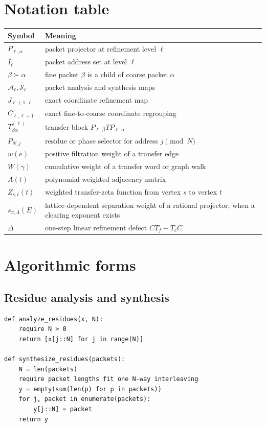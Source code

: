 \documentclass[11pt]{article}
\theoremstyle{definition}
\theoremstyle{remark}
\newcommand{\cA}{\mathcal A}
\newcommand{\cS}{\mathcal S}
\begin{document}
\appendix

\section{Notation table}

\begin{longtable}{L{0.28\textwidth}L{0.64\textwidth}}
\toprule
Symbol & Meaning \\
\midrule
\endhead
$P_{\ell,\alpha}$ & packet projector at refinement level $\ell$ \\
$I_\ell$ & packet address set at level $\ell$ \\
$\beta\succ\alpha$ & fine packet $\beta$ is a child of coarse packet $\alpha$ \\
$\cA_\ell,\cS_\ell$ & packet analysis and synthesis maps \\
$J_{\ell+1,\ell}$ & exact coordinate refinement map \\
$C_{\ell,\ell+1}$ & exact fine-to-coarse coordinate regrouping \\
$T^{(\ell)}_{\beta\alpha}$ & transfer block $P_{\ell,\beta}TP_{\ell,\alpha}$ \\
$P_{N,j}$ & residue or phase selector for address $j\pmod N$ \\
$w(e)$ & positive filtration weight of a transfer edge \\
$W(\gamma)$ & cumulative weight of a transfer word or graph walk \\
$A(t)$ & polynomial weighted adjacency matrix \\
$Z_{s,t}(t)$ & weighted transfer-zeta function from vertex $s$ to vertex $t$ \\
$s_{\pi,\Lambda}(E)$ & lattice-dependent separation weight of a rational projector, when a clearing exponent exists \\
$\Delta$ & one-step linear refinement defect $CT_f-T_cC$ \\
\bottomrule
\end{longtable}

\section{Algorithmic forms}\label{sec:algorithms}

\subsection{Residue analysis and synthesis}\label{alg:residue}

\begin{lstlisting}
def analyze_residues(x, N):
    require N > 0
    return [x[j::N] for j in range(N)]

def synthesize_residues(packets):
    N = len(packets)
    require packet lengths fit one N-way interleaving
    y = empty(sum(len(p) for p in packets))
    for j, packet in enumerate(packets):
        y[j::N] = packet
    return y
\end{lstlisting}
\end{document}
